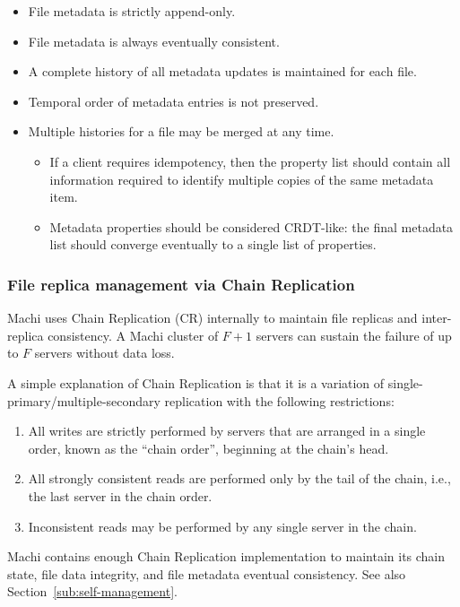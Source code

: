 \documentclass[preprint,10pt]{sigplanconf}
\begin{document}
\begin{itemize}
    \item File metadata is strictly append-only.
    \item File metadata is always eventually consistent.
    \item A complete history of all metadata updates is maintained for
      each file.  
    \item Temporal order of metadata entries is not preserved.
    \item Multiple histories for a file may be merged at any time.
    \begin{itemize}
        \item If a client requires idempotency, then the property list
          should contain all information required to identify multiple
          copies of the same metadata item.
        \item Metadata properties should be considered CRDT-like: the
          final metadata list should converge eventually to a single
          list of properties. 
    \end{itemize}
\end{itemize}

\subsubsection{File replica management via Chain Replication}
\label{sub:chain-replication}

Machi uses Chain Replication (CR) internally to maintain file
replicas and inter-replica consistency.
A Machi cluster of $F+1$ servers can sustain the failure of up
to $F$ servers without data loss.

A simple explanation of Chain Replication is that it is a variation of
single-primary/multiple-secondary replication with the following
restrictions:

\begin{enumerate}
\item All writes are strictly performed by servers that are arranged
  in a single order, known as the ``chain order'', beginning at the
  chain's head.
\item All strongly consistent reads are performed only by the tail of
  the chain, i.e., the last server in the chain order.
\item Inconsistent reads may be performed by any single server in the
  chain.
\end{enumerate}

Machi contains enough Chain Replication implementation to maintain its
chain state, file data integrity, and file metadata eventual
consistency.  See also Section~\ref{sub:self-management}.
\end{document}
